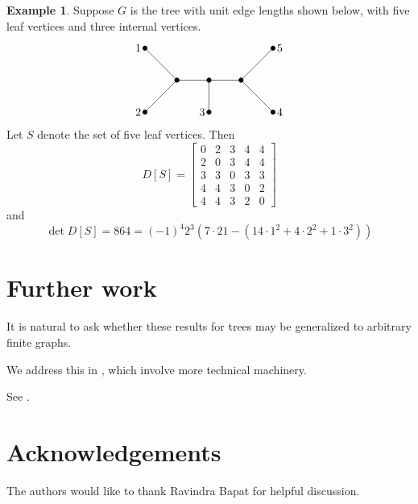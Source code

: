 \documentclass{amsart}
\theoremstyle{definition}
\newtheorem{eg}[thm]{Example}
\begin{document}
\begin{eg}
Suppose $G$ is the tree with unit edge lengths shown below, with five leaf vertices and three internal vertices.
\[
\begin{tikzpicture}
	\filldraw[black] (-2,1) coordinate (1) circle (2pt);
	\filldraw[black] (-2,-1) coordinate (2) circle (2pt);
	\filldraw[black] (0,-1) coordinate (3) circle (2pt);
	\filldraw[black] (2,-1) coordinate (4) circle (2pt);
	\filldraw[black] (2,1) coordinate (5) circle (2pt);
	\filldraw[black] (-1,0) coordinate (A) circle (2pt);
	\filldraw[black] (0,0) coordinate (B) circle (2pt);
	\filldraw[black] (1,0) coordinate (C) circle (2pt);

	\node[left] at (1) {$1$};
	\node[left] at (2) {$2$};
	\node[left] at (3) {$3$};
	\node[right] at (4) {$4$};
	\node[right] at (5) {$5$};

	\draw (B) -- (A) -- (1);
	\draw (A) -- (2);
	\draw (3) -- (B) -- (C) -- (4);
	\draw (C) -- (5);
\end{tikzpicture}
\]
Let $S$ denote the set of five leaf vertices. Then
$$
D[S] = \begin{bmatrix}
0 & 2 & 3 & 4 & 4 \\
2 & 0 & 3 & 4 & 4 \\
3 & 3 & 0 & 3 & 3 \\
4 & 4 & 3 & 0 & 2 \\
4 & 4 & 3 & 2 & 0
\end{bmatrix}
$$
and
$$
\det D[S] = 864
= (-1)^4 2^3 \left( 7 \cdot 21 - (14 \cdot 1^2 + 4 \cdot 2^2 + 1 \cdot 3^2) \right)
$$
\end{eg}

\section{Further work}

It is natural to ask whether these results for trees may be generalized to arbitrary finite graphs.

We address this in \cite{richman-shokrieh-wu}, which involve more technical machinery.

See \cite{richman-shokrieh-wu-2}.



\section*{Acknowledgements}
The authors would like to thank Ravindra Bapat for helpful discussion.


 

\end{document}
